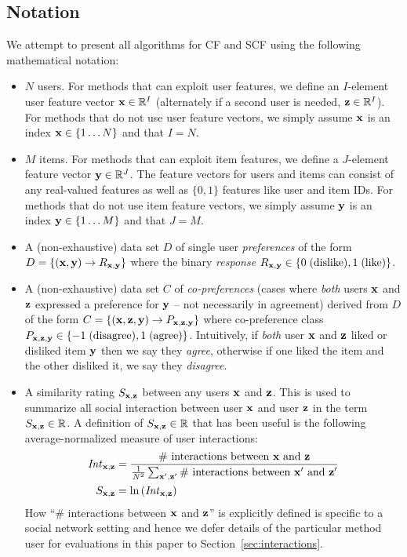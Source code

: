 
\subsection{Notation}

We attempt to present all algorithms for CF and SCF using the following
mathematical notation:
\begin{itemize}
\item $N$ users.  For methods that can exploit user features, we define 
an $I$-element user feature vector 
$\mathbf{x} \in \mathbb{R}^I$ (alternately if a second user is needed, $\mathbf{z} \in \mathbb{R}^I$).
For methods that do not use user feature vectors, we simply assume $\mathbf{x}$
is an index $\mathbf{x} \in \{ 1 \ldots N \}$ and that $I=N$.

\item $M$ items.  For methods that can exploit item features, we define
a $J$-element feature vector 
$\mathbf{y} \in \mathbb{R}^J$. The feature vectors for users 
and items can consist of any real-valued features as well as $\{0,1\}$
features like user and item IDs.
For methods that do not use item feature vectors, we simply assume $\mathbf{y}$
is an index $\mathbf{y} \in \{ 1 \ldots M \}$ and that $J=M$.

\item A (non-exhaustive) data set $D$ of single user \emph{preferences} of the form
$D = \{ (\mathbf{x}, \mathbf{y}) \to R_{\mathbf{x},\mathbf{y}} \}$ where 
the binary \emph{response} 
$R_{\mathbf{x},\mathbf{y}} \in \{ 0 \; \mbox{(dislike)}, 1 \; \mbox{(like)} \}$.

\item A (non-exhaustive) data set $C$ of \emph{co-preferences} (cases where
\emph{both} users $\mathbf{x}$ and $\mathbf{z}$ expressed a preference for $\mathbf{y}$ -- not
necessarily in agreement) derived from $D$ of the form
$C = \{ (\mathbf{x}, \mathbf{z}, \mathbf{y}) \to P_{\mathbf{x}, \mathbf{z}, \mathbf{y}} \}$ where co-preference class 
$P_{\mathbf{x}, \mathbf{z}, \mathbf{y}} \in \{ -1 \; \mbox{(disagree)}, 1 \;\mbox{(agree)} \}$.  
Intuitively, if \emph{both} user $\mathbf{x}$ and $\mathbf{z}$ liked or disliked item 
$\mathbf{y}$ then we say they \emph{agree}, otherwise if one liked the item and
the other disliked it, we say they \emph{disagree}.

\item A similarity rating $S_{\mathbf{x},\mathbf{z}}$ between any users $\mathbf{x}$ and $\mathbf{z}$. This is used to summarize all social
interaction between user $\mathbf{x}$ and user $\mathbf{z}$ in the term $S_{\mathbf{x},\mathbf{z}} \in
\mathbb{R}$.  A definition of $S_{\mathbf{x},\mathbf{z}} \in \mathbb{R}$ that has been useful is the
following average-normalized measure of user interactions:
\begin{align}
\mathit{Int}_{\mathbf{x},\mathbf{z}} & = \frac{\mbox{\# interactions between $\mathbf{x}$
and $\mathbf{z}$}}{\frac{1}{N^2} \sum_{\mathbf{x}',\mathbf{z}'} \mbox{\# interactions between $\mathbf{x}'$
and $\mathbf{z}'$}} \nonumber \\
S_{\mathbf{x},\mathbf{z}} & = \ln \left( \mathit{Int}_{\mathbf{x},\mathbf{z}} \right)
\end{align}
How ``\# interactions between $\mathbf{x}$ and $\mathbf{z}$'' is explicitly defined is
specific to a social network setting and hence we defer details of the
particular method user for evaluations in this paper to
Section~\ref{sec:interactions}.


\end{itemize}
